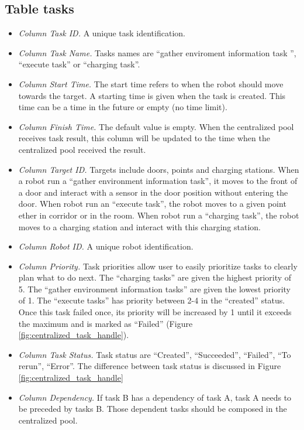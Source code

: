 \subsection*{Table tasks}
\begin{itemize}
    \label{sec:task_table}
    \item \textsl{Column Task ID.} A unique task identification.
    \item \textsl{Column Task Name.} Tasks names are ``gather enviroment information task '', ``execute task'' or ``charging task''.
    \item \textsl{Column Start Time.} The start time refers to when the robot should move towards the target. A starting time is given when the task is created. This time can be a time in the future or empty (no time limit). 
    \item \textsl{Column Finish Time.} The default value is empty. When the centralized pool receives task result, this column will be updated to the time when the centralized pool received the result.
    \item \textsl{Column Target ID.} Targets include doors, points and charging stations. When a robot run a ``gather environment information task'', it moves to the front of a door and interact with a sensor in the door position without entering the door. 
    When robot run an ``execute task'', the robot moves to a given point ether in corridor or in the room. When robot run a ``charging task'', the robot moves to a charging station and interact with this charging station.
    \item \textsl{Column Robot ID.} A unique robot identification.
    \item \textsl{Column Priority.} Task priorities allow user to easily prioritize tasks to clearly plan what to do next. The ``charging tasks'' are given the highest priority of 5. The ``gather environment information tasks'' are given the lowest priority of 1. The ``execute tasks'' has priority between 2-4 in the ``created'' status. Once this task failed once, its priority will be increased by 1 until it exceeds the maximum and is marked as ``Failed'' (Figure \ref{fig:centralized_task_handle}).
    \item \textsl{Column Task Status.} Task status are ``Created'', ``Succeeded'', ``Failed'', ``To rerun'', ``Error''. The difference between task status is discussed in Figure \ref{fig:centralized_task_handle}
    \item \textsl{Column Dependency.} If task B has a dependency of task A, task A needs to be preceded by tasks B. Those dependent tasks should be composed in the centralized pool.

\end{itemize}
